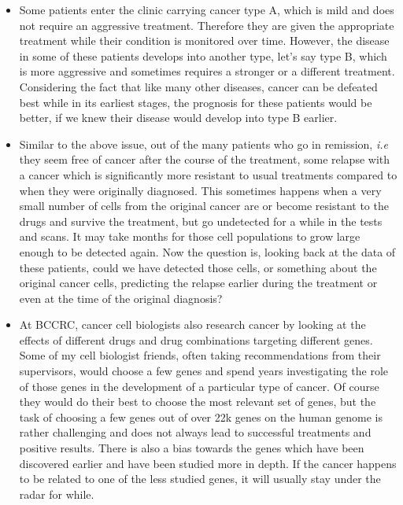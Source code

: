 \begin{itemize}
  \item Some patients enter the clinic carrying cancer type A, which is mild
    and does not require an aggressive treatment. Therefore they are given the
    appropriate treatment while their condition is monitored over time.
    However, the disease in some of these patients develops into another type,
    let's say type B, which is more aggressive and sometimes requires a
    stronger or a different treatment. Considering the fact that like many
    other diseases, cancer can be defeated best while in its earliest stages,
    the prognosis for these patients would be better, if we knew their disease
    would develop into type B earlier.

  \item Similar to the above issue, out of the many patients who go in
    remission, \emph{i.e} they seem free of cancer after the course of the
    treatment, some relapse with a cancer which is significantly more resistant
    to usual treatments compared to when they were originally diagnosed. This
    sometimes happens when a very small number of cells from the original
    cancer are or become resistant to the drugs and survive the treatment, but
    go undetected for a while in the tests and scans. It may take months for
    those cell populations to grow large enough to be detected again. Now the
    question is, looking back at the data of these patients, could we have
    detected those cells, or something about the original cancer cells,
    predicting the relapse earlier during the treatment or even at the time of
    the original diagnosis?

  \item At BCCRC, cancer cell biologists also research cancer by looking at the
    effects of different drugs and drug combinations targeting different genes.
    Some of my cell biologist friends, often taking recommendations from their
    supervisors, would choose a few genes and spend years investigating the
    role of those genes in the development of a particular type of cancer. Of
    course they would do their best to choose the most relevant set of genes,
    but the task of choosing a few genes out of over 22k genes on the human
    genome is rather challenging and does not always lead to successful
    treatments and positive results. There is also a bias towards the genes
    which have been discovered earlier and have been studied more in depth. If
    the cancer happens to be related to one of the less studied genes, it will
    usually stay under the radar for while.
\end{itemize}

